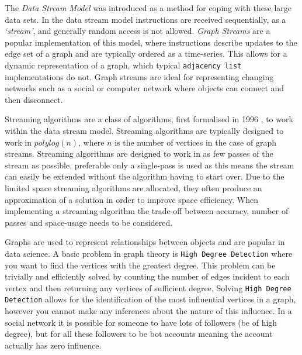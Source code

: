 \documentclass[11pt,twoside,a4paper]{report}
\begin{document}
\par The \textit{Data Stream Model} was introduced as a method for coping with these large data sets. In the data stream model instructions are received sequentially, as a \textit{`stream'}, and generally random access is not allowed. \textit{Graph Streams} are a popular implementation of this model, where instructions describe updates to the edge set of a graph and are typically ordered as a time-series. This allows for a dynamic representation of a graph, which typical \texttt{adjacency list} implementations do not. Graph streams are ideal for representing changing networks such as a social or computer network where objects can connect and then disconnect.

\par Streaming algorithms are a class of algorithms, first formalised in 1996 \cite{graphStreams}, to work within the data stream model. Streaming algorithms are typically designed to work in $polylog(n)$, where $n$ is the number of vertices in the case of graph streams. Streaming algorithms are designed to work in as few passes of the stream as possible, preferable only a single-pass is used as this means the stream can easily be extended without the algorithm having to start over. Due to the limited space streaming algorithms are allocated, they often produce an approximation of a solution in order to improve space efficiency. When implementing a streaming algorithm the trade-off between accuracy, number of passes and space-usage needs to be considered.

\par Graphs are used to represent relationships between objects and are popular in data science. A basic problem in graph theory is \texttt{High Degree Detection} where you want to find the vertices with the greatest degree. This problem can be trivially and efficiently solved by counting the number of edges incident to each vertex and then returning any vertices of sufficient degree. Solving \texttt{High Degree Detection} allows for the identification of the most influential vertices in a graph, however you cannot make any inferences about the nature of this influence. In a social network it is possible for someone to have lots of followers (\ie be of high degree), but for all these followers to be bot accounts meaning the account actually has zero influence.

\vspace{.3cm}\begin{adjustwidth}{.3cm}{}\end{adjustwidth}\vspace{.3cm}
\end{document}
